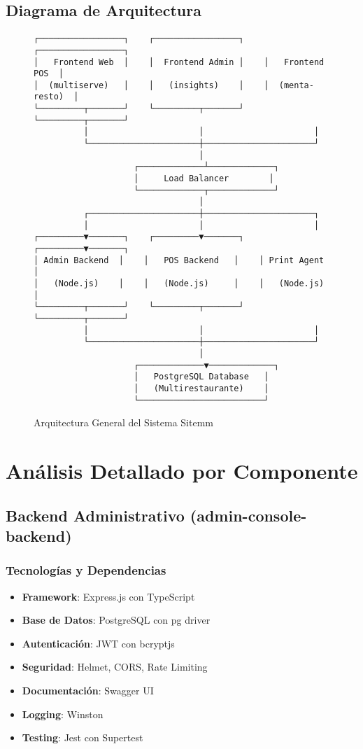 \documentclass[12pt,a4paper]{article}
\begin{document}
\subsection{Diagrama de Arquitectura}
\begin{figure}[H]
\centering
\begin{verbatim}
┌─────────────────┐    ┌─────────────────┐    ┌─────────────────┐
│   Frontend Web  │    │  Frontend Admin │    │   Frontend POS  │
│  (multiserve)   │    │   (insights)    │    │  (menta-resto)  │
└─────────┬───────┘    └─────────┬───────┘    └─────────┬───────┘
          │                      │                      │
          └──────────────────────┼──────────────────────┘
                                 │
                    ┌─────────────┴─────────────┐
                    │     Load Balancer        │
                    └─────────────┬─────────────┘
                                 │
          ┌──────────────────────┼──────────────────────┐
          │                      │                      │
┌─────────▼───────┐    ┌─────────▼───────┐    ┌─────────▼───────┐
│ Admin Backend  │    │   POS Backend   │    │ Print Agent     │
│   (Node.js)    │    │   (Node.js)     │    │   (Node.js)     │
└─────────┬───────┘    └─────────┬───────┘    └─────────┬───────┘
          │                      │                      │
          └──────────────────────┼──────────────────────┘
                                 │
                    ┌─────────────▼─────────────┐
                    │   PostgreSQL Database   │
                    │   (Multirestaurante)    │
                    └─────────────────────────┘
\end{verbatim}
\caption{Arquitectura General del Sistema Sitemm}
\end{figure}

\section{Análisis Detallado por Componente}

\subsection{Backend Administrativo (admin-console-backend)}

\subsubsection{Tecnologías y Dependencias}
\begin{itemize}
    \item \textbf{Framework}: Express.js con TypeScript
    \item \textbf{Base de Datos}: PostgreSQL con pg driver
    \item \textbf{Autenticación}: JWT con bcryptjs
    \item \textbf{Seguridad}: Helmet, CORS, Rate Limiting
    \item \textbf{Documentación}: Swagger UI
    \item \textbf{Logging}: Winston
    \item \textbf{Testing}: Jest con Supertest
\end{itemize}
\end{document}
